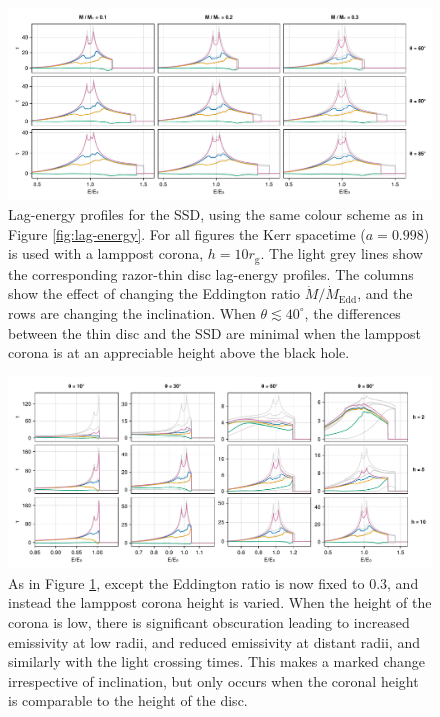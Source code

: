 \documentclass[fleqn,usenatbib]{mnras}
\newcommand{\rg}{r_\text{g}}
\begin{document}
\begin{figure}
	\centering
	\includegraphics[width=0.99\linewidth]{figures/reverberation.thick-disc.pdf}
    \caption{Lag-energy profiles for the SSD, using the same colour scheme as in
        Figure \ref{fig:lag-energy}. For all figures the Kerr spacetime
        ($a=0.998$) is used with a lamppost corona, $h = 10 \rg$. The light grey
        lines show the corresponding razor-thin disc lag-energy profiles. The
        columns show the effect of changing the Eddington ratio $\dot{M} /
        \dot{M}_\text{Edd}$, and the rows are changing the inclination. When
        $\theta \lesssim 40^\circ$, the differences between the thin disc and
        the SSD are minimal when the lamppost corona is at an appreciable height
        above the black hole.}
	\label{fig:reverb-thick-discs}
\end{figure}

\begin{figure}
	\centering
	\includegraphics[width=0.99\linewidth]{figures/reverberation.thick-disc-corona.pdf}
    \caption{As in Figure \ref{fig:reverb-thick-discs}, except the Eddington
        ratio is now fixed to $0.3$, and instead the lamppost corona height is
        varied. When the height of the corona is low, there is significant
        obscuration leading to increased emissivity at low radii, and reduced
        emissivity at distant radii, and similarly with the light crossing
    times. This makes a marked change irrespective of inclination, but only
occurs when the coronal height is comparable to the height of the disc.}
	\label{fig:reverb-thick-discs-corona}
\end{figure}
\end{document}
